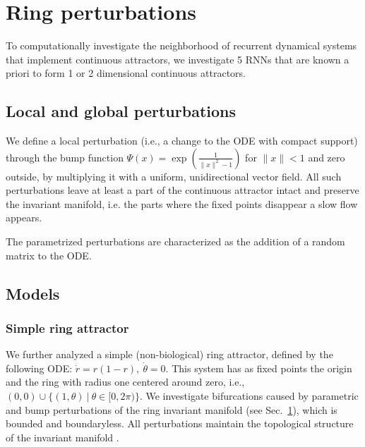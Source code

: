 \documentclass{article} %
\newcounter{ct}
\theoremstyle{definition}
\theoremstyle{remark}
\begin{document}
\newpage
\section{Ring perturbations}\label{sec:supp:ring_perturbations}


To computationally investigate the neighborhood of recurrent dynamical systems that implement continuous attractors, we investigate 5 RNNs that are known a priori to form 1 or 2 dimensional continuous attractors.

\subsection{Local and global perturbations}
We define a local perturbation (i.e., a change to the ODE with compact support) through the bump function $\Psi(x) = \exp\left(\frac{1}{\|x\|^2-1}\right)$ for $\|x\|<1$ and zero outside, by multiplying it with a uniform, unidirectional vector field. All such perturbations leave at least a part of the continuous attractor intact and preserve the invariant manifold, i.e. the parts where the fixed points disappear a slow flow appears.

The parametrized perturbations are characterized as the addition of a random matrix to the ODE. 




\subsection{Models}
\subsubsection{Simple ring attractor}
We further analyzed a simple (non-biological)  ring attractor, defined by the following ODE: $\dot r = r(1-r), \ \dot \theta = 0.$
This system has as fixed points the origin and the ring with radius one centered around zero, i.e., $(0,0)\cup\{(1,\theta)\ |\ \theta\in[0,2\pi)\}$.
We investigate bifurcations caused by parametric and bump perturbations of the ring invariant manifold (see Sec.~\ref{sec:supp:ring_perturbations}), which is bounded and boundaryless.
All perturbations maintain the topological structure of the invariant manifold . %
\end{document}
